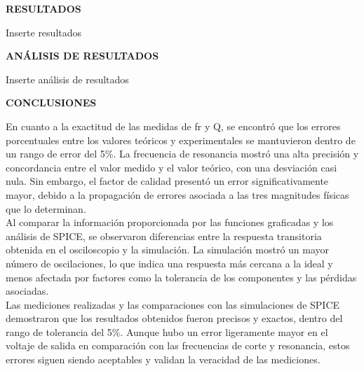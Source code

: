 \documentclass[12pt]{article}
\begin{document}
    \newpage
    
    \begin{center}
        \textbf{\large RESULTADOS}\\
    \end{center}
    
    Inserte resultados
    
    \newpage
    
    \begin{center}
        \textbf{\large ANÁLISIS DE RESULTADOS}\\
    \end{center}
    
    Inserte análisis de resultados
    
    \newpage
    
    \begin{center}
        \textbf{\large CONCLUSIONES}\\
    \end{center}
    
    En cuanto a la exactitud de las medidas de fr y Q, se encontró que los errores porcentuales entre los valores teóricos y experimentales se mantuvieron dentro de un rango de error del 5\%. La frecuencia de resonancia mostró una alta precisión y concordancia entre el valor medido y el valor teórico, con una desviación casi nula. Sin embargo, el factor de calidad presentó un error significativamente mayor, debido a la propagación de errores asociada a las tres magnitudes físicas que lo determinan.\\
    
    Al comparar la información proporcionada por las funciones graficadas y los análisis de SPICE, se observaron diferencias entre la respuesta transitoria obtenida en el osciloscopio y la simulación. La simulación mostró un mayor número de oscilaciones, lo que indica una respuesta más cercana a la ideal y menos afectada por factores como la tolerancia de los componentes y las pérdidas asociadas.\\
    
    Las mediciones realizadas y las comparaciones con las simulaciones de SPICE demostraron que los resultados obtenidos fueron precisos y exactos, dentro del rango de tolerancia del 5\%. Aunque hubo un error ligeramente mayor en el voltaje de salida en comparación con las frecuencias de corte y resonancia, estos errores siguen siendo aceptables y validan la veracidad de las mediciones.\\
    
\end{document}

